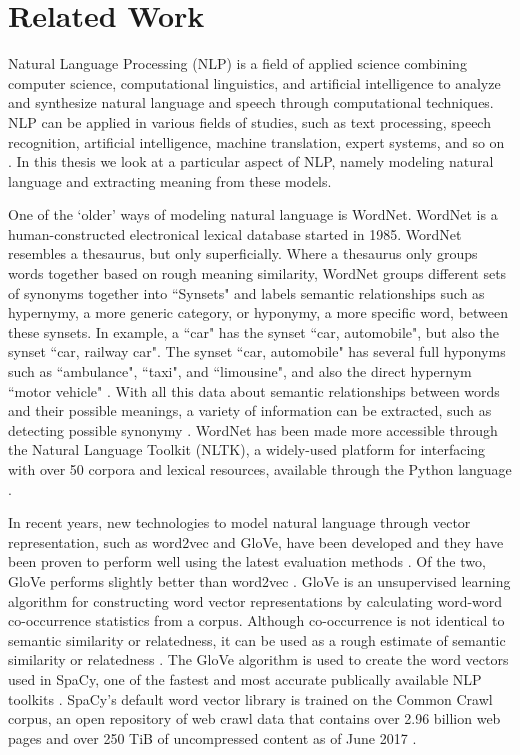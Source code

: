 \documentclass{article}
\begin{document}
\section{Related Work} \label{sec:relwork}

Natural Language Processing (NLP) is a field of applied science combining computer science, computational linguistics, and artificial intelligence to analyze and synthesize natural language and speech through computational techniques. NLP can be applied in various fields of studies, such as text processing, speech recognition, artificial intelligence, machine translation, expert systems, and so on \citep{chowdhury2003natural}. In this thesis we look at a particular aspect of NLP, namely modeling natural language and extracting meaning from these models.

One of the `older' ways of modeling natural language is WordNet. WordNet is a human-constructed electronical lexical database started in 1985. WordNet resembles a thesaurus, but only superficially. Where a thesaurus only groups words together based on rough meaning similarity, WordNet groups different sets of synonyms together into ``Synsets" and labels semantic relationships such as hypernymy, a more generic category, or hyponymy, a more specific word, between these synsets. In example, a ``car" has the synset ``car, automobile", but also the synset ``car, railway car". The synset ``car, automobile" has several full hyponyms such as ``ambulance", ``taxi", and ``limousine", and also the direct hypernym ``motor vehicle" \cite{princeton2010wordnet}. With all this data about semantic relationships between words and their possible meanings, a variety of information can be extracted, such as detecting possible synonymy \cite{kilgarriff2000wordnet}.
WordNet has been made more accessible through the Natural Language Toolkit (NLTK), a widely-used platform for interfacing with over 50 corpora and lexical resources, available through the Python language \cite{bird2006nltk}.

In recent years, new technologies to model natural language through vector representation, such as word2vec and GloVe, have been developed \citep{mikolov2013efficient, pennington2014glove} and they have been proven to perform well using the latest evaluation methods \citep{schnabel2015evaluation}. Of the two, GloVe performs slightly better than word2vec \citep{lee2016combining}.
GloVe is an unsupervised learning algorithm for constructing word vector representations by calculating word-word co-occurrence statistics from a corpus. Although co-occurrence is not identical to semantic similarity or relatedness, it can be used as a rough estimate of semantic similarity or relatedness \citep{levy2015improving}. The GloVe algorithm is used to create the word vectors used in SpaCy, one of the fastest and most accurate publically available NLP toolkits \citep{choi2015depends}. SpaCy's default word vector library is trained on the Common Crawl corpus, an open repository of web crawl data that contains over 2.96 billion web pages and over 250 TiB of uncompressed content as of June 2017 \citep{nagel2017commoncrawl}.
\end{document}
